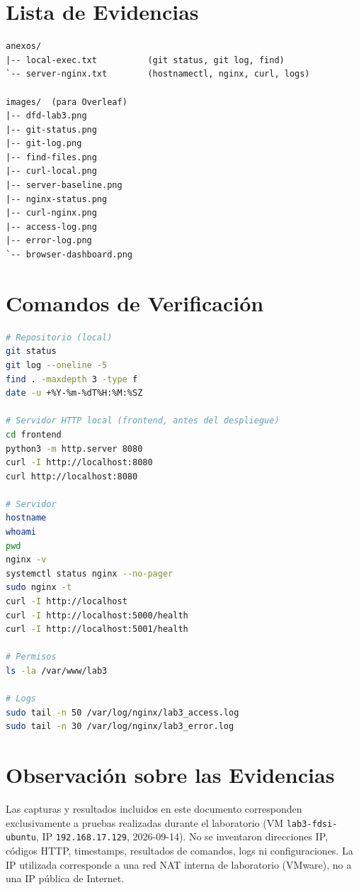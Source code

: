 \documentclass[journal]{IEEEtran}
\begin{document}
\section{Lista de Evidencias}

\begin{lstlisting}
anexos/
|-- local-exec.txt          (git status, git log, find)
`-- server-nginx.txt        (hostnamectl, nginx, curl, logs)

images/  (para Overleaf)
|-- dfd-lab3.png
|-- git-status.png
|-- git-log.png
|-- find-files.png
|-- curl-local.png
|-- server-baseline.png
|-- nginx-status.png
|-- curl-nginx.png
|-- access-log.png
|-- error-log.png
`-- browser-dashboard.png
\end{lstlisting}

\section{Comandos de Verificación}
\label{app:comandos}

\begin{lstlisting}[language=bash]
# Repositorio (local)
git status
git log --oneline -5
find . -maxdepth 3 -type f
date -u +%Y-%m-%dT%H:%M:%SZ

# Servidor HTTP local (frontend, antes del despliegue)
cd frontend
python3 -m http.server 8080
curl -I http://localhost:8080
curl http://localhost:8080

# Servidor
hostname
whoami
pwd
nginx -v
systemctl status nginx --no-pager
sudo nginx -t
curl -I http://localhost
curl -I http://localhost:5000/health
curl -I http://localhost:5001/health

# Permisos
ls -la /var/www/lab3

# Logs
sudo tail -n 50 /var/log/nginx/lab3_access.log
sudo tail -n 30 /var/log/nginx/lab3_error.log
\end{lstlisting}

\section{Observación sobre las Evidencias}

Las capturas y resultados incluidos en este documento corresponden
exclusivamente a pruebas realizadas durante el laboratorio (VM
\texttt{lab3-fdsi-ubuntu}, IP \texttt{192.168.17.129}, 2026-09-14). No se
inventaron direcciones IP, códigos HTTP, timestamps, resultados de comandos,
logs ni configuraciones. La IP utilizada corresponde a una red NAT interna de
laboratorio (VMware), no a una IP pública de Internet.
\end{document}
